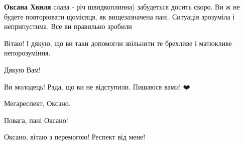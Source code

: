 \begin{itemize}
\begin{itemize}
\textbf{Оксана Хвиля} слава - річ швидкоплинна) забудеться досить скоро. Ви ж
не будете повторювати щомісяця, як вищезазначена пані. Ситуація зрозуміла і
неприпустима. Все ви правильно зробили
\end{itemize}

 
Вітаю! І дякую, що ви таки допомогли звільнити те брехливе і матюкливе непорозуміння.

 
Дякую Вам!

 
Ви молодець! Рада, що ви не відступили. Пишаюся вами! ❤️

 
Мегареспект, Оксано.

 
Повага, пані Оксано!

 
Оксано, вітаю з перемогою! Респект від мене!

\end{itemize}

